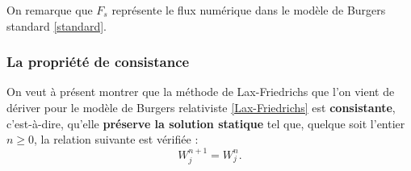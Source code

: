 \documentclass[11pt,a4paper]{article}
\begin{document}
On remarque que $F_s$ représente le flux numérique dans le modèle de Burgers standard \eqref{standard}. 

\subsubsection{La propriété de consistance}
 
On veut à présent montrer que la méthode de Lax-Friedrichs que l'on vient de dériver pour le modèle de Burgers relativiste \eqref{Lax-Friedrichs} est \textbf{consistante}, c'est-à-dire, qu'elle \textbf{préserve la solution statique} tel que, quelque soit l'entier $n\geq 0$, la relation suivante est vérifiée : 
\begin{equation}\label{discrete_equation}
	W_j^{n+1} = W_j^n. 
\end{equation}
\end{document}
